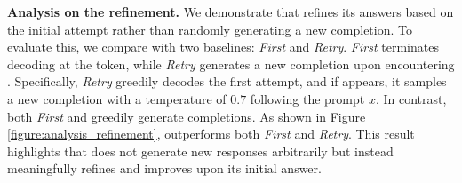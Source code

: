 \newcommand{\first}{\textit{First}\xspace}
\newcommand{\retry}{\textit{Retry}\xspace}


\textbf{Analysis on the refinement.} We demonstrate that \sname refines its answers based on the initial attempt rather than randomly generating a new completion. 
To evaluate this, we compare \sname with two baselines: \first and \retry. 
\first terminates decoding at the \rethink token, while \retry generates a new completion upon encountering \rethink.
Specifically, \retry greedily decodes the first attempt, and if \rethink appears, it samples a new completion with a temperature of $0.7$ following the prompt $x$. In contrast, both \first and \sname greedily generate completions.
% 
As shown in Figure \ref{figure:analysis_refinement}, \sname outperforms both \first and \retry. This result highlights that \sname does not generate new responses arbitrarily but instead meaningfully refines and improves upon its initial answer.